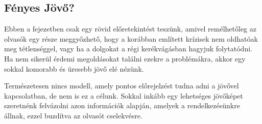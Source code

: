 \subsection{Fényes Jövő?}

Ebben a fejezetben csak egy rövid előretekintést teszünk, amivel remélhetőleg az olvasók egy
része meggyőzhető, hogy a korábban említett krízisek nem oldhatóak meg tétlenséggel, vagy
ha a dolgokat a régi kerékvágásban hagyjuk folytatódni. Ha nem sikerül érdemi megoldásokat
találni ezekre a problémákra, akkor egy sokkal komorabb és üresebb jövő elé nézünk.

Természetesen nincs modell, amely pontos előrejelzést tudna adni a jövővel kapcsolatban,
de nem is ez a célunk. Sokkal inkább egy lehetséges jövőképet szeretnénk felvázolni
azon információk alapján, amelyek a rendelkezésünkre állnak, ezzel buzdítva az olvasót
cselekvésre.

